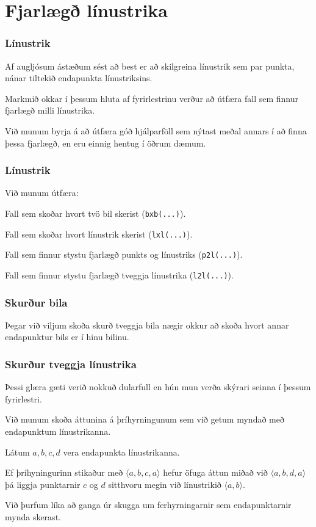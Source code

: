 \section{Fjarlægð línustrika}

{
	\frametitle{Línustrik}
	{
		\item<1-> Af augljósum ástæðum sést að best er að skilgreina línustrik sem par punkta, nánar tiltekið endapunkta línustriksins.
		\item<2-> Markmið okkar í þessum hluta af fyrirlestrinu verður að útfæra fall sem finnur fjarlægð milli línustrika.
		\item<3-> Við munum byrja á að útfæra góð hjálparföll sem nýtast meðal annars í að finna þessa fjarlægð, en eru einnig
			hentug í öðrum dæmum.
	}
}

{
	\frametitle{Línustrik}
	{
		\item<1-> Við munum útfæra:
		{
			\item<2-> Fall sem skoðar hvort tvö bil skerist (\texttt{bxb(...)}).
			\item<3-> Fall sem skoðar hvort línustrik skerist (\texttt{lxl(...)}).
			\item<4-> Fall sem finnur stystu fjarlægð punkts og línustriks (\texttt{p2l(...)}).
			\item<5-> Fall sem finnur stystu fjarlægð tveggja línustrika (\texttt{l2l(...)}).
		}
	}
}

{
	\frametitle{Skurður bila}
	{
		\item<1-> Þegar við viljum skoða skurð tveggja bila nægir okkur að skoða hvort annar endapunktur bils er í hinu bilinu.
		\item<2->[] 
	}
}

{
	\frametitle{Skurður tveggja línustrika}
	{
		\item<1-> Þessi glæra gæti verið nokkuð dularfull en hún mun verða skýrari seinna í þessum fyrirlestri.
		\item<2-> Við munum skoða áttunina á þríhyrningunum sem við getum myndað með endapunktum línustrikanna.
		\item<3-> Látum $a, b, c, d$ vera endapunkta línustrikanna.
		\item<4-> Ef þríhyningurinn stikaður með $\langle a, b, c, a \rangle$ hefur öfuga áttun miðað við $\langle a, b, d, a \rangle$ þá liggja
			punktarnir $c$ og $d$ sitthvoru megin við línustrikið $\langle a, b \rangle$.
		\item<5-> Við þurfum líka að ganga úr skugga um ferhyrningarnir sem endapunktarnir mynda skerast.
	}
}


